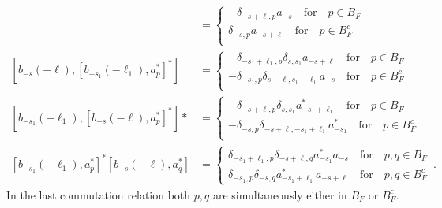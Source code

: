 \documentclass[sn-mathphys, Numbered ,a4paper]{sn-jnl}%
\theoremstyle{plain}
\theoremstyle{definition}
\theoremstyle{remark}
\theoremstyle{plain}
\theoremstyle{definition}
\theoremstyle{remark}
\begin{document}
\begin{align}
	[b_{-s}(-\ell), a^*_{p}] &= 
	\begin{cases}
		-\delta_{-s+\ell,p}a_{-s} \quad\text{for}\quad p \in B_F\\
		\delta_{-s,p}a_{-s+\ell} \quad\text{for}\quad p \in B^c_F\\
	\end{cases}\label{eq:comm2}\\
	\left[b_{-s}(-\ell), [b_{-s_1}(-\ell_1),a^*_{p}]^*\right]&=\begin{cases}
		-\delta_{-s_1+\ell_1,p}\delta_{s,s_1}a_{-s+\ell} \quad\text{for}\quad p \in B_F\\
		-\delta_{-s_1,p}\delta_{s-\ell,s_1-\ell_1}a_{-s} \quad\text{for}\quad p \in B^c_F\\
	\end{cases}\label{eq:comm3}\\
	\left[b_{-s_1}(-\ell_1),[b_{-s}(-\ell), a^*_{p}]^* \right]* &=\begin{cases}
		-\delta_{-s+\ell,p}\delta_{s,s_1}a^*_{-s_1+\ell_1} \quad\text{for}\quad p \in B_F\\
		-\delta_{-s,p}\delta_{-s+\ell,-s_1+\ell_1}a^*_{-s_1} \quad\text{for}\quad p \in B^c_F\\
	\end{cases}\label{eq:comm4}\\
	[b_{-s_1}(-\ell_1),a^*_{p}]^*[b_{-s}(-\ell), a^*_{q}] 
	&=\begin{cases}
		\delta_{-s_1+\ell_1,p}\delta_{-s+\ell,q}a^*_{-s_1}a_{-s} \quad\text{for}\quad p,q \in B_F\\
		\delta_{-s_1,p}\delta_{-s,q}a^*_{-s_1+\ell_1}a_{-s+\ell} \quad\text{for}\quad p,q \in B^c_F 
	\end{cases}\label{eq:comm5}\,.
\end{align}
In the last commutation relation both $p,q$ are simultaneously either in $B_F$ or $B_F^c$.
\end{document}
